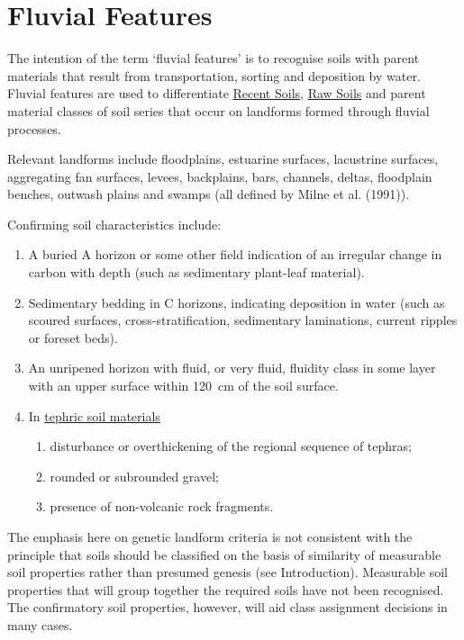 \documentclass[
  letterpaper,
  DIV=11,
  numbers=noendperiod]{scrreprt}
\providecommand{\tightlist}{%
  \setlength{\itemsep}{0pt}\setlength{\parskip}{0pt}}\usepackage{longtable,booktabs,array}
\begin{document}
\hypertarget{sec-diag-fluv}{%
\section{Fluvial Features}\label{sec-diag-fluv}}

The intention of the term `fluvial features' is to recognise soils with
parent materials that result from transportation, sorting and deposition
by water. Fluvial features are used to differentiate
\protect\hyperlink{sec-ord-R}{Recent Soils},
\protect\hyperlink{sec-ord-W}{Raw Soils} and parent material classes of
soil series that occur on landforms formed through fluvial processes.

Relevant landforms include floodplains, estuarine surfaces, lacustrine
surfaces, aggregating fan surfaces, levees, backplains, bars, channels,
deltas, floodplain benches, outwash plains and swamps (all defined by
Milne et al. (1991)).

Confirming soil characteristics include:

\begin{enumerate}
\def\labelenumi{\arabic{enumi}.}
\tightlist
\item
  A buried A horizon or some other field indication of an irregular
  change in carbon with depth (such as sedimentary plant-leaf material).
\item
  Sedimentary bedding in C horizons, indicating deposition in water
  (such as scoured surfaces, cross-stratification, sedimentary
  laminations, current ripples or foreset beds).
\item
  An unripened horizon with fluid, or very fluid, fluidity class in some
  layer with an upper surface within 120~cm of the soil surface.
\item
  In \protect\hyperlink{sec-diag-teph}{tephric soil materials}

  \begin{enumerate}
  \def\labelenumii{\alph{enumii}.}
  \tightlist
  \item
    disturbance or overthickening of the regional sequence of tephras;
  \item
    rounded or subrounded gravel;
  \item
    presence of non-volcanic rock fragments.
  \end{enumerate}
\end{enumerate}

The emphasis here on genetic landform criteria is not consistent with
the principle that soils should be classified on the basis of similarity
of measurable soil properties rather than presumed genesis (see
Introduction). Measurable soil properties that will group together the
required soils have not been recognised. The confirmatory soil
properties, however, will aid class assignment decisions in many cases.
\end{document}
